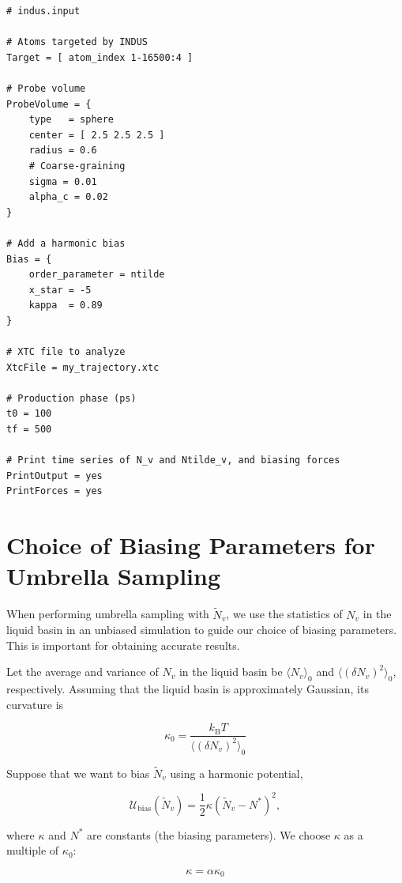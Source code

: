 \documentclass[11pt,notitlepage]{article}
\begin{document}
\begin{lstlisting}
# indus.input

# Atoms targeted by INDUS
Target = [ atom_index 1-16500:4 ]

# Probe volume
ProbeVolume = {
	type   = sphere
	center = [ 2.5 2.5 2.5 ]
	radius = 0.6
	# Coarse-graining
	sigma = 0.01
	alpha_c = 0.02
}

# Add a harmonic bias
Bias = {
	order_parameter = ntilde
	x_star = -5
	kappa  = 0.89
}

# XTC file to analyze
XtcFile = my_trajectory.xtc

# Production phase (ps)
t0 = 100
tf = 500

# Print time series of N_v and Ntilde_v, and biasing forces
PrintOutput = yes
PrintForces = yes
\end{lstlisting}


\section{Choice of Biasing Parameters for Umbrella Sampling}

When performing umbrella sampling with $\tilde{N}_v$, we use the statistics of $N_v$ in the liquid basin in an unbiased simulation to guide our choice of biasing parameters. This is important for obtaining accurate results.

Let the average and variance of $N_v$ in the liquid basin be $\langle N_v \rangle_0$ and $\langle (\delta N_v)^2 \rangle_0$, respectively. Assuming that the liquid basin is approximately Gaussian, its curvature is

\begin{equation}
	\kappa_0 = \frac{k_{\text{B}} T}{\langle (\delta N_v)^2 \rangle_0}
\end{equation}

Suppose that we want to bias $\tilde{N}_v$ using a harmonic potential,

\begin{equation} \label{eqn:harmonicbias}
	\mathcal{U}_{\text{bias}}(\tilde{N}_v) = \frac{1}{2} \kappa (\tilde{N}_v - N^*)^2,
\end{equation}

\noindent where $\kappa$ and $N^*$ are constants (the biasing parameters). We choose $\kappa$ as a multiple of $\kappa_0$:

\begin{equation}
	\kappa = \alpha \kappa_0
\end{equation}
\end{document}
